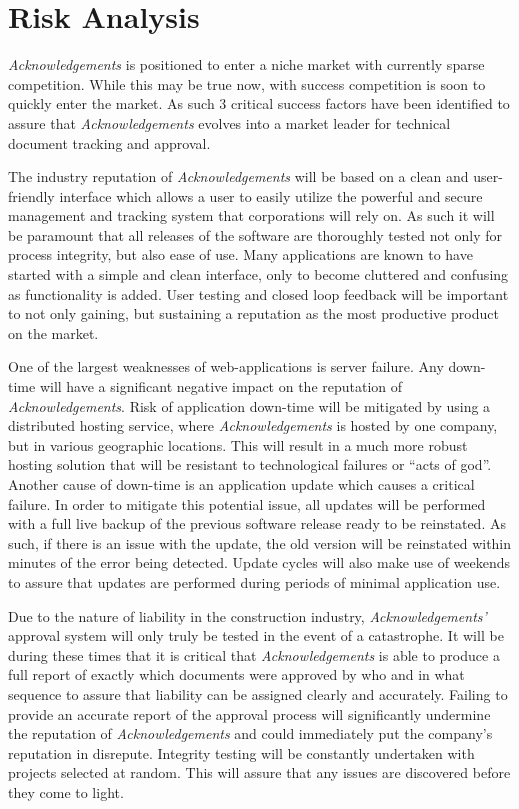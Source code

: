 \section{Risk Analysis}

{\it Acknowledgements} is positioned to enter a niche market with currently sparse competition. While this may be true now, with success competition is soon to quickly enter the market. As such 3 critical success factors have been identified to assure that {\it Acknowledgements} evolves into a market leader for technical document tracking and approval.

The industry reputation of {\it Acknowledgements} will be based on a clean and user-friendly interface which allows a user to easily utilize the powerful and secure management and tracking system that corporations will rely on. As such it will be paramount that all releases of the software are thoroughly tested not only for process integrity, but also ease of use. Many applications are known to have started with a simple and clean interface, only to become cluttered and confusing as functionality is added. User testing and closed loop feedback will be important to not only gaining, but sustaining a reputation as the most productive product on the market.

One of the largest weaknesses of web-applications is server failure. Any down-time will have a significant negative impact on the reputation of {\it Acknowledgements}. Risk of application down-time will be mitigated by using a distributed hosting service, where {\it Acknowledgements} is hosted by one company, but in various geographic locations. This will result in a much more robust hosting solution that will be resistant to technological failures or ``acts of god''. Another cause of down-time is an application update which causes a critical failure. In order to mitigate this potential issue, all updates will be performed with a full live backup of the previous software release ready to be reinstated. As such, if there is an issue with the update, the old version will be reinstated within minutes of the error being detected. Update cycles will also make use of weekends to assure that updates are performed during periods of minimal application use.

Due to the nature of liability in the construction industry, {\it Acknowledgements'} approval system will only truly be tested in the event of a catastrophe. It will be during these times that it is critical that {\it Acknowledgements} is able to produce a full report of exactly which documents were approved by who and in what sequence to assure that liability can be assigned clearly and accurately. Failing to provide an accurate report of the approval process will significantly undermine the reputation of {\it Acknowledgements} and could immediately put the company's reputation in disrepute. Integrity testing will be constantly undertaken with projects selected at random. This will assure that any issues are discovered before they come to light.


